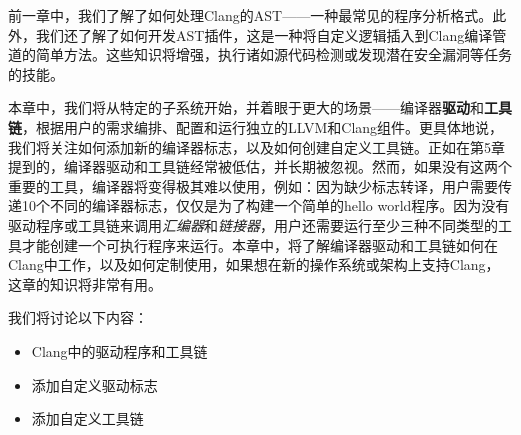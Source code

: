 前一章中，我们了解了如何处理Clang的AST——一种最常见的程序分析格式。此外，我们还了解了如何开发AST插件，这是一种将自定义逻辑插入到Clang编译管道的简单方法。这些知识将增强，执行诸如源代码检测或发现潜在安全漏洞等任务的技能。

本章中，我们将从特定的子系统开始，并着眼于更大的场景——编译器\textbf{驱动}和\textbf{工具链}，根据用户的需求编排、配置和运行独立的LLVM和Clang组件。更具体地说，我们将关注如何添加新的编译器标志，以及如何创建自定义工具链。正如在第5章提到的，编译器驱动和工具链经常被低估，并长期被忽视。然而，如果没有这两个重要的工具，编译器将变得极其难以使用，例如：因为缺少标志转译，用户需要传递10个不同的编译器标志，仅仅是为了构建一个简单的hello world程序。因为没有驱动程序或工具链来调用\textit{汇编器}和\textit{链接器}，用户还需要运行至少三种不同类型的工具才能创建一个可执行程序来运行。本章中，将了解编译器驱动和工具链如何在Clang中工作，以及如何定制使用，如果想在新的操作系统或架构上支持Clang，这章的知识将非常有用。

我们将讨论以下内容：

\begin{itemize}
\item Clang中的驱动程序和工具链
\item 添加自定义驱动标志
\item 添加自定义工具链
\end{itemize}











